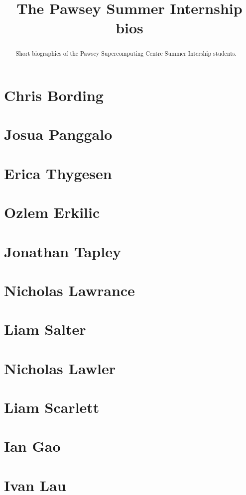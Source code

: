 \documentclass[11pt,a4paper]{report}
\title{The Pawsey Summer Internship bios}
\begin{document}
\maketitle
\tableofcontents


\begin{abstract}

Short biographies of the Pawsey Supercomputing Centre Summer Intership students.

\end{abstract}

\chapter{Chris Bording}


\chapter{Josua Panggalo}


\chapter{Erica Thygesen}


\chapter{Ozlem Erkilic}


\chapter{Jonathan Tapley}


\chapter{Nicholas Lawrance}


\chapter{Liam Salter}


\chapter{Nicholas Lawler}


\chapter{Liam Scarlett}


\chapter{Ian Gao}


\chapter{Ivan Lau}

\end{document}
